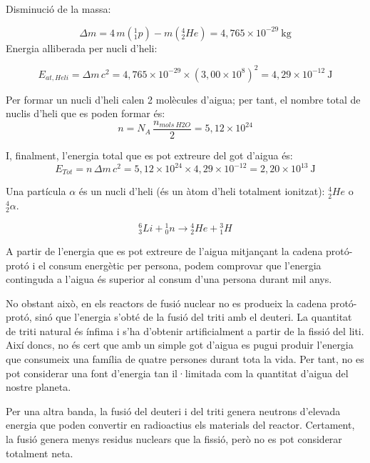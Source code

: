 \begin{solapartat}
Disminució de la massa:

\[ \Delta m = 4\,m\left({}^{1}_{1}p\right) - m\left({}^{4}_{2}He\right) = 4,765\times 10^{-29}\ \mathrm{kg} \]
Energia alliberada per nucli d'heli:

\[ E_{at,Heli} = \Delta m\, c^2 = 4,765\times 10^{-29}\times(3,00\times 10^{8})^2 = 4,29\times 10^{-12}\ \mathrm{J} \]

 Per formar un nucli d'heli calen 2 molècules d'aigua; per tant, el nombre total de nuclis d'heli que es poden formar és:
\[ n = N_A\,\frac{n_{mols\ H2O}}{2} = 5,12\times 10^{24} \]

 I, finalment, l'energia total que es pot extreure del got d'aigua és:
\[ E_{Tot} = n\,\Delta m\, c^2 = 5,12\times 10^{24}\times 4,29\times 10^{-12} = 2,20\times 10^{13}\ \mathrm{J} \]
\end{solapartat}

\begin{solapartat}
 Una partícula $\alpha$ és un nucli d'heli (és un àtom d'heli totalment ionitzat): ${}^{4}_{2}He$ o ${}^{4}_{2}\alpha$.

\[ {}^{6}_{3}Li + {}^{1}_{0}n \rightarrow {}^{4}_{2}He + {}^{3}_{1}H \]

 A partir de l'energia que es pot extreure de l'aigua mitjançant la cadena protó-protó i el consum energètic per persona, podem comprovar que l'energia continguda a l'aigua és superior al consum d'una persona durant mil anys.

No obstant això, en els reactors de fusió nuclear no es produeix la cadena protó-protó, sinó que l'energia s'obté de la fusió del triti amb el deuteri. La quantitat de triti natural és ínfima i s'ha d'obtenir artificialment a partir de la fissió del liti. Així doncs, no és cert que amb un simple got d'aigua es pugui produir l'energia que consumeix una família de quatre persones durant tota la vida. Per tant, no es pot considerar una font d'energia tan il·limitada com la quantitat d'aigua del nostre planeta.

 Per una altra banda, la fusió del deuteri i del triti genera neutrons d'elevada energia que poden convertir en radioactius els materials del reactor. Certament, la fusió genera menys residus nuclears que la fissió, però no es pot considerar totalment neta.
\end{solapartat}
